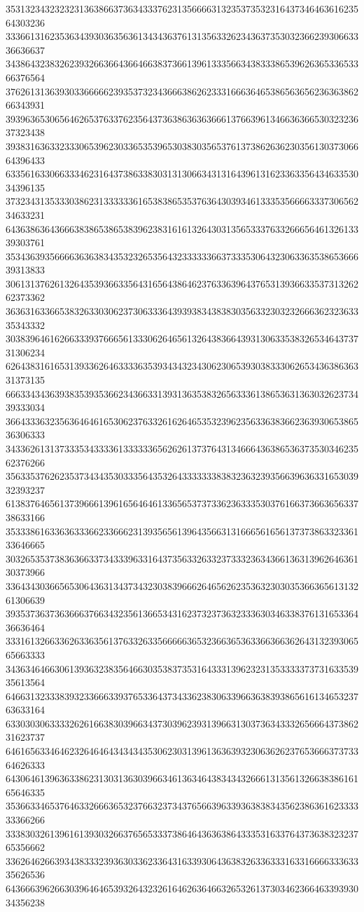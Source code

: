 35313234323232313638663736343337623135666631323537353231643734646361623564303236
33366131623536343930363563613434363761313563326234363735303236623930663336636637
34386432383262393266366436646638373661396133356634383338653962636533653366376564
37626131363930336666623935373234366638626233316663646538656365623636386266343931
39396365306564626537633762356437363863636366613766396134663636653032323637323438
39383163633233306539623033653539653038303565376137386263623035613037306664396433
63356163306633346231643738633830313130663431316439613162336335643463353034396135
37323431353330386231333333616538386535376364303934613335356666333730656234633231
64363863643666383865386538396238316161326430313565333763326665646132613339303761
35343639356666363638343532326535643233333366373335306432306336353865366639313833
30613137626132643539366335643165643864623763363964376531393663353731326262373362
36363163366538326330306237306333643939383438383035633230323266636232363335343332
30383964616266333937666561333062646561326438366439313063353832653464373731306234
62643831616531393362646333363539343432343062306539303833306265343638636331373135
66633434363938353935366234366331393136353832656333613865363136303262373439333034
36643336323563646461653062376332616264653532396235633638366236393065386536306333
34336261313733353433336133333365626261373764313466643638653637353034623562376266
35633537626235373434353033356435326433333338383236323935663963633165303932393237
61383764656137396661396165646461336565373733623633353037616637366365633738633166
35333861633636333662336662313935656139643566313166656165613737386332336133646665
30326535373836366337343339633164373563326332373332363436613631396264636130373966
33643430366565306436313437343230383966626465626235363230303536636561313261306639
39353736373636663766343235613665343162373237363233363034633837613165336436636464
33316132663362633635613763326335666663653236636536336636636264313239306565663333
34363464663061393632383564663035383735316433313962323135333337373163353935613564
64663132333839323366633937653364373433623830633966363839386561613465323763633164
63303030633332626166383039663437303962393139663130373634333265666437386231623737
64616563346462326464643434343530623031396136363932306362623765366637373364626333
64306461396363386231303136303966346136346438343432666131356132663838616165646335
35366334653764633266636532376632373437656639633936383834356238636162333333366266
33383032613961613930326637656533373864643636386433353163376437363832323765356662
33626462663934383332393630336233643163393064363832633633316331666633363335626536
64366639626630396464653932643232616462636466326532613730346236646339393034356238
